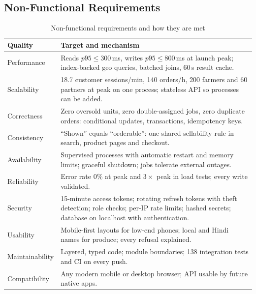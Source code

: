 \documentclass[manuscript,screen,review]{acmart}
\begin{document}
\subsection{Non-Functional Requirements}

\begin{table}[htbp]
  \caption{Non-functional requirements and how they are met}
  \label{tab:nfr}
  \small
  \begin{tabularx}{\columnwidth}{@{}p{}L@{}}
    \toprule
    \textbf{Quality} & \textbf{Target and mechanism} \\
    \midrule
    Performance & Reads $p95 \le 300$\,ms, writes $p95 \le 800$\,ms at launch peak; index-backed geo queries, batched joins, 60\,s result cache. \\
    Scalability & 18.7 customer sessions/min, 140 orders/h, 200 farmers and 60 partners at peak on one process; stateless API so processes can be added. \\
    Correctness & Zero oversold units, zero double-assigned jobs, zero duplicate orders: conditional updates, transactions, idempotency keys. \\
    Consistency & ``Shown'' equals ``orderable'': one shared sellability rule in search, product pages and checkout. \\
    Availability & Supervised processes with automatic restart and memory limits; graceful shutdown; jobs tolerate external outages. \\
    Reliability & Error rate 0\% at peak and $3\times$ peak in load tests; every write validated. \\
    Security & 15-minute access tokens; rotating refresh tokens with theft detection; role checks; per-IP rate limits; hashed secrets; database on localhost with authentication. \\
    Usability & Mobile-first layouts for low-end phones; local and Hindi names for produce; every refusal explained. \\
    Maintainability & Layered, typed code; module boundaries; 138 integration tests and CI on every push. \\
    Compatibility & Any modern mobile or desktop browser; API usable by future native apps. \\
    \bottomrule
  \end{tabularx}
\end{table}
\end{document}
